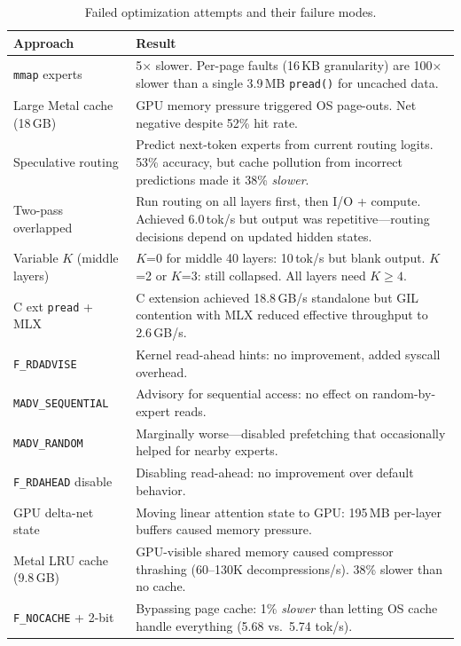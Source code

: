 \documentclass[11pt,twocolumn]{article}
\begin{document}
\begin{table}[t]
\centering
\small
\caption{Failed optimization attempts and their failure modes.}
\label{tab:failures}
\begin{tabular}{@{}p{2.2cm}p{4.3cm}@{}}
\toprule
\textbf{Approach} & \textbf{Result} \\
\midrule
\texttt{mmap} experts & 5$\times$ slower. Per-page faults (16\,KB granularity) are 100$\times$ slower than a single 3.9\,MB \texttt{pread()} for uncached data. \\
\addlinespace
Large Metal cache (18\,GB) & GPU memory pressure triggered OS page-outs. Net negative despite 52\% hit rate. \\
\addlinespace
Speculative routing & Predict next-token experts from current routing logits. 53\% accuracy, but cache pollution from incorrect predictions made it 38\% \emph{slower}. \\
\addlinespace
Two-pass overlapped & Run routing on all layers first, then I/O + compute. Achieved 6.0\,tok/s but output was repetitive---routing decisions depend on updated hidden states. \\
\addlinespace
Variable $K$ (middle layers) & $K$=0 for middle 40 layers: 10\,tok/s but blank output. $K$=2 or $K$=3: still collapsed. All layers need $K \geq 4$. \\
\addlinespace
C ext \texttt{pread} + MLX & C extension achieved 18.8\,GB/s standalone but GIL contention with MLX reduced effective throughput to 2.6\,GB/s. \\
\addlinespace
\texttt{F\_RDADVISE} & Kernel read-ahead hints: no improvement, added syscall overhead. \\
\addlinespace
\texttt{MADV\_SEQUENTIAL} & Advisory for sequential access: no effect on random-by-expert reads. \\
\addlinespace
\texttt{MADV\_RANDOM} & Marginally worse---disabled prefetching that occasionally helped for nearby experts. \\
\addlinespace
\texttt{F\_RDAHEAD} disable & Disabling read-ahead: no improvement over default behavior. \\
\addlinespace
GPU delta-net state & Moving linear attention state to GPU: 195\,MB per-layer buffers caused memory pressure. \\
\addlinespace
Metal LRU cache (9.8\,GB) & GPU-visible shared memory caused compressor thrashing (60--130K decompressions/s). 38\% slower than no cache. \\
\addlinespace
\texttt{F\_NOCACHE} + 2-bit & Bypassing page cache: 1\% \emph{slower} than letting OS cache handle everything (5.68 vs.\ 5.74 tok/s). \\
\bottomrule
\end{tabular}
\end{table}
\end{document}
